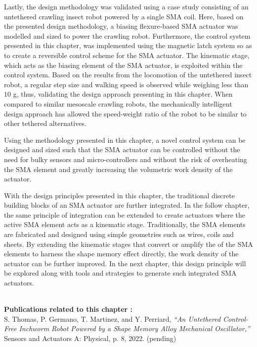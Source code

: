 Lastly, the design methodology was validated using a case study consisting of an untethered crawling insect robot powered by a single SMA coil. Here, based on the presented design methodology, a biasing flexure-based SMA actuator was modelled and sized to power the crawling robot. Furthermore, the control system presented in this chapter, was implemented using the magnetic latch system so as to create a reversible control scheme for the SMA actuator. The kinematic stage, which acts as the biasing element of the SMA actuator, is exploited within the control system. Based on the results from the locomotion of the untethered insect robot, a regular step size and walking speed is observed while weighing less than $10$ g, thus, validating the design approach presenting in this chapter. When compared to similar mesoscale crawling robots, the mechanically intelligent design approach has allowed the speed-weight ratio of the robot to be similar to other tethered alternatives.

Using the methodology presented in this chapter, a novel control system can be designed and sized such that the SMA actuator can be controlled without the need for bulky sensors and micro-controllers and without the risk of overheating the SMA element and greatly increasing the volumetric work density of the actuator.

With the design principles presented in this chapter, the traditional discrete building blocks of an SMA actuator are further integrated. In the follow chapter, the same principle of integration can be extended to create actuators where the active SMA element acts as a kinematic stage. Traditionally, the SMA elements are fabricated and designed using simple geometries such as wires, coils and sheets. By extending the kinematic stages that convert or amplify the of the SMA elements to harness the shape memory effect directly, the work density of the actuator can be further improved. In the next chapter, this design principle will be explored along with tools and strategies to generate such integrated SMA actuators.

\vspace*{\fill}
\noindent\hrulefill \\
\textbf{\large Publications related to this chapter :}\\

S. Thomas, P. Germano, T. Martinez, and Y. Perriard, \textit{“An Untethered Control-Free Inchworm Robot Powered by a Shape Memory Alloy Mechanical Oscillator,”} Sensors and Actuators A: Physical, p. 8, 2022. (pending)\\

